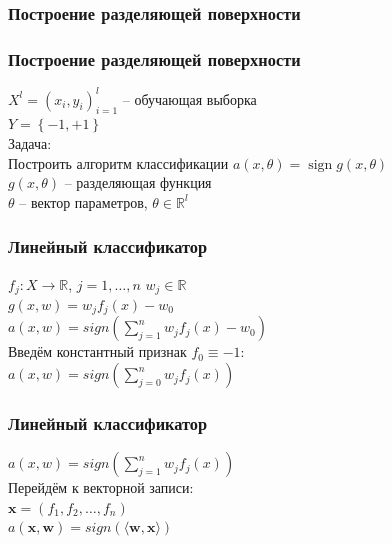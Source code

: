 \documentclass[12pt]{beamer}
\DeclareMathOperator{\sign}{sign}
\begin{document}
\begin{frame}\frametitle{Построение разделяющей поверхности}
\end{frame}


\begin{frame}\frametitle{Построение разделяющей поверхности}
${X^l = (x_i,y_i)_{i = 1}^l}$ -- обучающая выборка\\ 
${Y=\left\{-1,+1\right\}}$\\
\vspace{5mm}
Задача:\\
Построить алгоритм классификации ${a(x,\theta) = \sign g(x,\theta)}$\\\vspace{5mm}
${g(x,\theta)}$ -- разделяющая функция\\
$\theta$ -- вектор параметров, $\theta \in \mathbb{R}^l$
\end{frame}


\begin{frame}\frametitle{Линейный классификатор}
$f_j: X \rightarrow \mathbb{R}$, $j = 1,\dots, n$ \hspace{5mm} $w_j \in \mathbb{R}$\\
$g(x, w) = w_jf_j(x) - w_0$\\
\vspace{5mm}
$a(x, w) = sign(\sum\limits_{j=1}^n w_jf_j(x) - w_0)$\\

\vspace{7mm}
Введём константный признак $f_0 \equiv -1$:\\
$a(x, w) = sign(\sum\limits_{j=0}^n w_jf_j(x))$\\
\end{frame}

\begin{frame}\frametitle{Линейный классификатор}
$a(x, w) = sign(\sum\limits_{j=1}^n w_jf_j(x))$\\

\vspace{3mm}
Перейдём к векторной записи:\\
$\mathbf{x} = (f_1, f_2, \dots, f_n)$\\
\vspace{3mm}
$a(\mathbf{x}, \mathbf{w}) = sign(\langle \mathbf{w}, \mathbf{x}\rangle)$\\
\end{frame}
\end{document}
